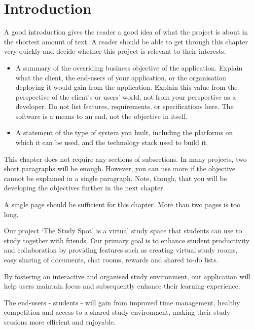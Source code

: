 \chapter{Introduction}
\label{chap:introduction}


\begin{expectations}
A good introduction gives the reader a good idea of what the project is about in the shortest amount of text.  A reader should be able to get through this chapter very quickly and decide whether this project is relevant to their interests.
\begin{itemize}
\item A summary of the overriding business objective of the application.  Explain what the client, the end-users of your application, or the organisation deploying it would gain from the application.  Explain this value from the perspective of the client's or users' world, not from your perspective as a developer.   Do not list features, requirements, or specifications here.  The software is a means to an end, not the objective in itself.
\item A statement of the type of system you built, including the platforms on which it can be used, and the technology stack used to build it.
\end{itemize}
This chapter does not require any sections of subsections.  In many projects, two short paragraphs will be enough.  However, you can use more if the objective cannot be explained in a single paragraph.  Note, though, that you will be developing the objectives further in the next chapter.

\end{expectations}

\begin{length}
A single page should be sufficient for this chapter.  More than two pages is too long.
\end{length}

 Our project ‘The Study Spot’ is a virtual study space that students can use to study together with friends.
Our primary goal is to enhance student productivity and collaboration by providing features such as creating virtual study rooms, easy sharing of documents, chat rooms, rewards and shared to-do lists. 

By fostering an interactive and organised study environment, our application will help users maintain focus and subsequently enhance their learning experience.

The end-users - students - will gain from improved time management, healthy competition and access to a shared study environment, making their study sessions more efficient and enjoyable. 